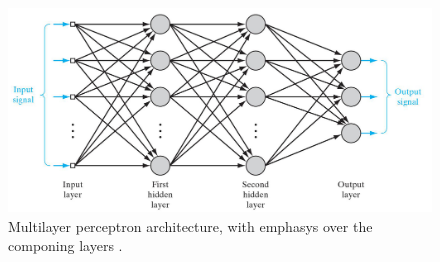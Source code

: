 \begin{figure}[!htb]
\centering
\includegraphics[width=.80\columnwidth]{images/111multilayerperceptron}
\caption[Multilayer perceptron]{Multilayer perceptron architecture, with
emphasys over the componing layers
\cite{RefWorks:158}.}
\label{fig:111multilayerperceptron}
\end{figure}